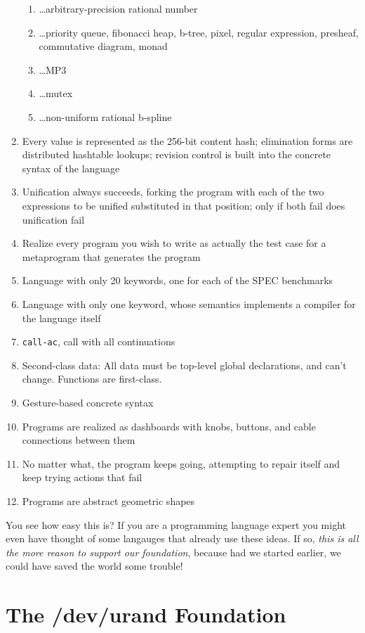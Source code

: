 \documentclass[acmtocl]%
{boviktrans}
\begin{document}
\begin{enumerate}
\begin{enumerate}
     \item \ldots arbitrary-precision rational number
     \item \ldots priority queue, fibonacci heap, b-tree, pixel, regular expression, presheaf, commutative diagram, monad
     \item \ldots MP3
     \item \ldots mutex
     \item \ldots non-uniform rational b-spline
   \end{enumerate}
\item Every value is represented as the 256-bit content hash; elimination forms are distributed hashtable lookups; revision control is built into the concrete syntax of the language
\item Unification always succeeds, forking the program with each of the two expressions to be unified substituted in that position; only if both fail does unification fail
\item Realize every program you wish to write as actually the test case for a metaprogram that generates the program
\item Language with only 20 keywords, one for each of the SPEC benchmarks
\item Language with only one keyword, whose semantics implements a compiler for the language itself
\item {\tt call-ac}, call with all continuations
\item Second-class data: All data must be top-level global declarations, and can't change. Functions are first-class.
\item Gesture-based concrete syntax
\item Programs are realized as dashboards with knobs, buttons, and cable connections between them
\item No matter what, the program keeps going, attempting to repair itself and keep trying actions that fail
\item Programs are abstract geometric shapes
\end{enumerate}

You see how easy this is? If you are a programming language expert you
might even have thought of some langauges that already use these
ideas. If so, {\it this is all the more reason to support our
  foundation}, because had we started earlier, we could have saved the
world some trouble!

\section{The /dev/urand Foundation}
\end{document}

